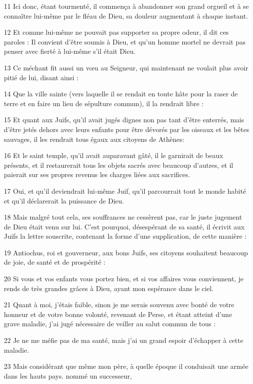 \par 11 Ici donc, étant tourmenté, il commença à abandonner son grand orgueil et à se connaître lui-même par le fléau de Dieu, sa douleur augmentant à chaque instant.
\par 12 Et comme lui-même ne pouvait pas supporter sa propre odeur, il dit ces paroles : Il convient d'être soumis à Dieu, et qu'un homme mortel ne devrait pas penser avec fierté à lui-même s'il était Dieu.
\par 13 Ce méchant fit aussi un vœu au Seigneur, qui maintenant ne voulait plus avoir pitié de lui, disant ainsi :
\par 14 Que la ville sainte (vers laquelle il se rendait en toute hâte pour la raser de terre et en faire un lieu de sépulture commun), il la rendrait libre :
\par 15 Et quant aux Juifs, qu'il avait jugés dignes non pas tant d'être enterrés, mais d'être jetés dehors avec leurs enfants pour être dévorés par les oiseaux et les bêtes sauvages, il les rendrait tous égaux aux citoyens de Athènes:
\par 16 Et le saint temple, qu'il avait auparavant gâté, il le garnirait de beaux présents, et il restaurerait tous les objets sacrés avec beaucoup d'autres, et il paierait sur ses propres revenus les charges liées aux sacrifices.
\par 17 Oui, et qu'il deviendrait lui-même Juif, qu'il parcourrait tout le monde habité et qu'il déclarerait la puissance de Dieu.
\par 18 Mais malgré tout cela, ses souffrances ne cessèrent pas, car le juste jugement de Dieu était venu sur lui. C'est pourquoi, désespérant de sa santé, il écrivit aux Juifs la lettre souscrite, contenant la forme d'une supplication, de cette manière :
\par 19 Antiochus, roi et gouverneur, aux bons Juifs, ses citoyens souhaitent beaucoup de joie, de santé et de prospérité :
\par 20 Si vous et vos enfants vous portez bien, et si vos affaires vous conviennent, je rends de très grandes grâces à Dieu, ayant mon espérance dans le ciel.
\par 21 Quant à moi, j'étais faible, sinon je me serais souvenu avec bonté de votre honneur et de votre bonne volonté, revenant de Perse, et étant atteint d'une grave maladie, j'ai jugé nécessaire de veiller au salut commun de tous :
\par 22 Je ne me méfie pas de ma santé, mais j'ai un grand espoir d'échapper à cette maladie.
\par 23 Mais considérant que même mon père, à quelle époque il conduisait une armée dans les hauts pays. nommé un successeur,
